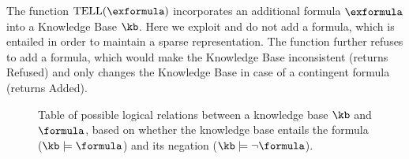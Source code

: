The function $\mathrm{TELL}(\exformula)$ incorporates an additional formula $\exformula$ into a Knowledge Base $\kb$.
Here we exploit  and do not add a formula, which is entailed in order to maintain a sparse representation. %
The function further refuses to add a formula, which would make the Knowledge Base inconsistent (returns Refused) and only changes the Knowledge Base in case of a contingent formula (returns Added).


\begin{figure}
    \begin{center}
        
    \end{center}
    \caption{Table of possible logical relations between a knowledge base $\kb$ and $\formula$, based on whether the knowledge base entails the formula ($\kb\models\formula$) and its negation ($\kb\models\lnot\formula$).}\label{fig:askDecisionTable}
\end{figure}


